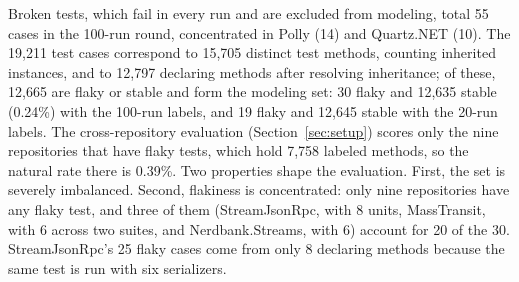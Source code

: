 Broken tests, which fail in every run and are excluded from modeling, total 55 cases in the 100-run round, concentrated in Polly (14) and Quartz.NET (10). The 19,211 test cases correspond to 15,705 distinct test methods, counting inherited instances, and to 12,797 declaring methods after resolving inheritance; of these, 12,665 are flaky or stable and form the modeling set: 30 flaky and 12,635 stable (0.24\%) with the 100-run labels, and 19 flaky and 12,645 stable with the 20-run labels. The cross-repository evaluation (Section~\ref{sec:setup}) scores only the nine repositories that have flaky tests, which hold 7,758 labeled methods, so the natural rate there is 0.39\%. Two properties shape the evaluation. First, the set is severely imbalanced. Second, flakiness is concentrated: only nine repositories have any flaky test, and three of them (StreamJsonRpc, with 8 units, MassTransit, with 6 across two suites, and Nerdbank.Streams, with 6) account for 20 of the 30. StreamJsonRpc's 25 flaky cases come from only 8 declaring methods because the same test is run with six serializers. 
